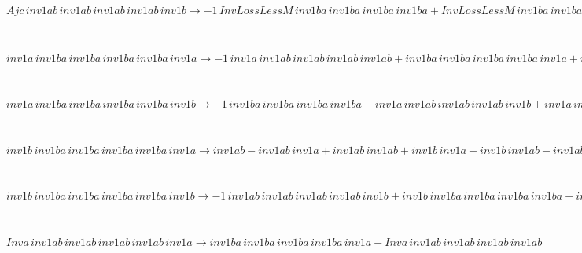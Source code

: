 \documentclass[rep10,leqno]{report}
\begin{document}
\begin{minipage}{6in}
$
Ajc\,
 inv1ab\,
 inv1ab\,
 inv1ab\,
 inv1ab\,
 inv1b\rightarrow -1\,
 InvLossLessM\,
 inv1ba\,
 inv1ba\,
 inv1ba\,
 inv1ba + InvLossLessM\,
 inv1ba\,
 inv1ba\,
 inv1ba\,
 inv1ba\,
 inv1b
$
\end{minipage}\medskip \\
\begin{minipage}{6in}
$
inv1a\,
 inv1ba\,
 inv1ba\,
 inv1ba\,
 inv1ba\,
 inv1a\rightarrow -1\,
 inv1a\,
 inv1ab\,
 inv1ab\,
 inv1ab\,
 inv1ab + inv1ba\,
 inv1ba\,
 inv1ba\,
 inv1ba\,
 inv1a + inv1a\,
 inv1ab\,
 inv1ab\,
 inv1ab\,
 inv1ab\,
 inv1a
$
\end{minipage}\medskip \\
\begin{minipage}{6in}
$
inv1a\,
 inv1ba\,
 inv1ba\,
 inv1ba\,
 inv1ba\,
 inv1b\rightarrow -1\,
 inv1ba\,
 inv1ba\,
 inv1ba\,
 inv1ba - inv1a\,
 inv1ab\,
 inv1ab\,
 inv1ab\,
 inv1b + inv1a\,
 inv1ba\,
 inv1ba\,
 inv1ba\,
 inv1ba + inv1ba\,
 inv1ba\,
 inv1ba\,
 inv1ba\,
 inv1b + inv1a\,
 inv1ab\,
 inv1ab\,
 inv1ab\,
 inv1ab\,
 inv1b
$
\end{minipage}\medskip \\
\begin{minipage}{6in}
$
inv1b\,
 inv1ba\,
 inv1ba\,
 inv1ba\,
 inv1ba\,
 inv1a\rightarrow inv1ab - inv1ab\,
 inv1a + inv1ab\,
 inv1ab + inv1b\,
 inv1a - inv1b\,
 inv1ab - inv1ab\,
 inv1ab\,
 inv1a + inv1ab\,
 inv1ab\,
 inv1ab + inv1b\,
 inv1ab\,
 inv1a - inv1b\,
 inv1ab\,
 inv1ab - inv1ab\,
 inv1ab\,
 inv1ab\,
 inv1a + inv1ab\,
 inv1ab\,
 inv1ab\,
 inv1ab + inv1b\,
 inv1ab\,
 inv1ab\,
 inv1a - inv1b\,
 inv1ab\,
 inv1ab\,
 inv1ab - inv1ab\,
 inv1ab\,
 inv1ab\,
 inv1ab\,
 inv1a + inv1b\,
 inv1ab\,
 inv1ab\,
 inv1ab\,
 inv1a - inv1b\,
 inv1ab\,
 inv1ab\,
 inv1ab\,
 inv1ab + inv1b\,
 inv1ab\,
 inv1ab\,
 inv1ab\,
 inv1ab\,
 inv1a
$
\end{minipage}\medskip \\
\begin{minipage}{6in}
$
inv1b\,
 inv1ba\,
 inv1ba\,
 inv1ba\,
 inv1ba\,
 inv1b\rightarrow -1\,
 inv1ab\,
 inv1ab\,
 inv1ab\,
 inv1ab\,
 inv1b + inv1b\,
 inv1ba\,
 inv1ba\,
 inv1ba\,
 inv1ba + inv1b\,
 inv1ab\,
 inv1ab\,
 inv1ab\,
 inv1ab\,
 inv1b
$
\end{minipage}\medskip \\
\begin{minipage}{6in}
$
Inva\,
 inv1ab\,
 inv1ab\,
 inv1ab\,
 inv1ab\,
 inv1a\rightarrow inv1ba\,
 inv1ba\,
 inv1ba\,
 inv1ba\,
 inv1a + Inva\,
 inv1ab\,
 inv1ab\,
 inv1ab\,
 inv1ab
$
\end{minipage}\medskip \\
\end{document}
